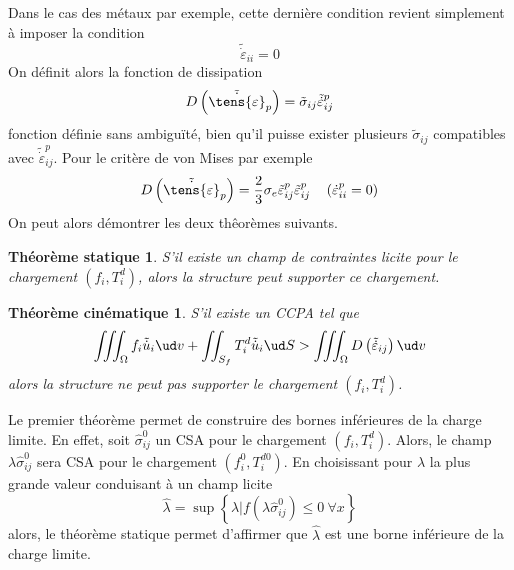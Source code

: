 Dans le cas des métaux par exemple, cette dernière condition revient simplement à imposer la condition 
\begin{equation}
    \tilde{\dot{\varepsilon}}_{ii} = 0
    \label{eq:Ch10-055}
\end{equation}
On définit alors la fonction de dissipation 
\begin{equation}
    D\left( \tilde{\dot{\tens{\varepsilon}}}_p \right) = \tilde{\sigma}_{ij} \tilde{\dot{\varepsilon}}_{ij}^p
    \label{eq:Ch10-056}
\end{equation}
fonction définie sans ambiguïté, bien qu'il puisse exister plusieurs $\tilde{\sigma}_{ij}$ compatibles avec $\tilde{\dot{\varepsilon}}_{ij}^p$.
Pour le critère de von Mises par exemple 
\begin{equation}
    D\left( \tilde{\dot{\tens{\varepsilon}}}_p \right) = \frac{2}{3} \sigma_e \tilde{\varepsilon}_{ij}^p \tilde{\varepsilon}_{ij}^p \quad \left( \dot{\varepsilon}_{ii}^p = 0 \right)
    \label{eq:Ch10-057}
\end{equation}
On peut alors démontrer les deux thêorèmes suivants.
\newtheorem*{ThSta}{Théorème statique}
\begin{ThSta}
    S'il existe un champ de contraintes licite pour le chargement $\left( f_i, T_i^d \right)$, alors la structure peut supporter ce chargement.
\end{ThSta}
\newtheorem*{ThCin}{Théorème cinématique}
\begin{ThCin}
    S'il existe un CCPA tel que 
    \begin{equation}
        \iiint_{\Omega} f_i \tilde{\dot{u}}_i \ud v + \iint_{S_f} T_i^d \tilde{\dot{u}}_i \ud S > \iiint_{\Omega} D \left( \tilde{\dot{\varepsilon}}_{ij} \right) \ud v
        \label{eq:Ch10-058}
    \end{equation}
    alors la structure ne peut pas supporter le chargement $\left( f_i, T_i^d \right)$.
\end{ThCin}
Le premier théorème permet de construire des bornes inférieures de la charge limite.
En effet, soit $\hat{\sigma}_{ij}^0$ un CSA pour le chargement $\left( f_i, T_i^d \right)$.
Alors, le champ $\lambda \hat{\sigma}_{ij}^0$ sera CSA pour le chargement $\left( f^0_i, T_i^{d0} \right)$.
En choisissant pour $\lambda$ la plus grande valeur conduisant à un champ licite 
\begin{equation}
    \hat{\lambda} = \sup \left\{ \lambda | f\left( \lambda \hat{\sigma}_{ij}^0 \right) \leq 0\ \forall x \right\}
    \label{eq:Ch10-059}
\end{equation}
alors, le théorème statique permet d'affirmer que $\hat{\lambda}$ est une borne inférieure de la charge limite. 

